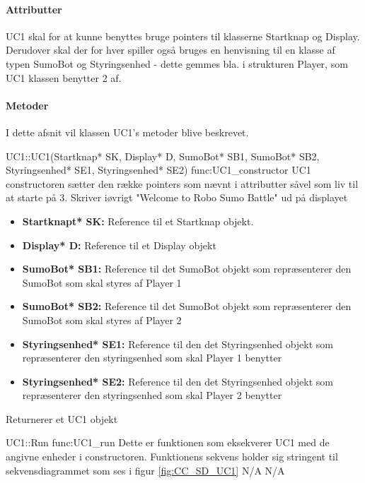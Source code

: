 \paragraph{Attributter}
UC1 skal for at kunne benyttes bruge pointers til klasserne Startknap og Display. Derudover skal der for hver spiller også bruges en henvisning til en klasse af typen SumoBot og Styringsenhed - dette gemmes bla. i strukturen Player, som UC1 klassen benytter 2 af. 
\paragraph{Metoder}
I dette afsnit vil klassen UC1's metoder blive beskrevet. 

\begin{functionDescription}
{UC1::UC1(Startknap* SK, Display* D, SumoBot* SB1, SumoBot* SB2, Styringsenhed* SE1, Styringsenhed* SE2)}
{func:UC1_constructor}
{UC1 constructoren sætter den række pointers som nævnt i attributter såvel som liv til at starte på 3. Skriver iøvrigt "Welcome to Robo Sumo Battle" ud på displayet}
{\begin{itemize}
    \item \textbf{Startknapt* SK:} Reference til et Startknap objekt. 
    \item \textbf{Display* D:} Reference til et Display objekt
    \item \textbf{SumoBot* SB1:} Reference til det SumoBot objekt som repræsenterer den SumoBot som skal styres af Player 1
    \item \textbf{SumoBot* SB2:} Reference til det SumoBot objekt som repræsenterer den SumoBot som skal styres af Player 2
    \item \textbf{Styringsenhed* SE1:} Reference til den det Styringsenhed objekt som repræsenterer den styringsenhed som skal Player 1 benytter
    \item \textbf{Styringsenhed* SE2:} Reference til den det Styringsenhed objekt som repræsenterer den styringsenhed som skal Player 2 benytter
\end{itemize}}
{Returnerer et UC1 objekt}
\end{functionDescription}

\begin{functionDescription}
{UC1::Run}
{func:UC1_run}
{Dette er funktionen som eksekverer UC1 med de angivne enheder i constructoren. Funktionens sekvens holder sig stringent til sekvensdiagrammet som ses i figur \ref{fig:CC_SD_UC1}}
{N/A}
{N/A}
\end{functionDescription}

